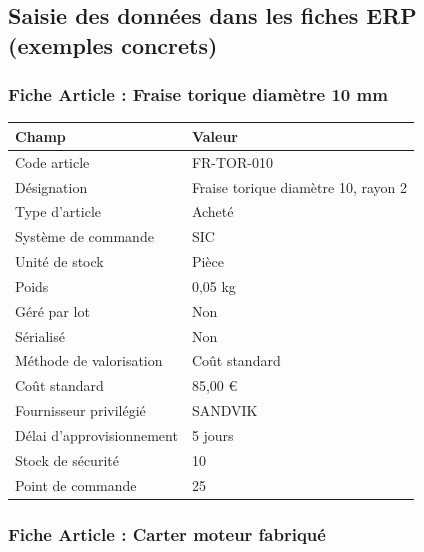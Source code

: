 \documentclass{article}
\begin{document}
\begin{table}[h]
\subsection{Saisie des données dans les fiches ERP (exemples concrets)}

\subsubsection{Fiche Article : Fraise torique diamètre 10 mm}

\begin{tcolorbox}[colback=grisclair, colframe=gray!70!black, title=Exemple : Fiche article ERP - Fraise torique]
\begin{tabular}{|l|l|}
\hline
\textbf{Champ} & \textbf{Valeur} \\
\hline
Code article & \textsc{FR-TOR-010} \\
Désignation & Fraise torique diamètre 10, rayon 2 \\
Type d'article & Acheté \\
Système de commande & SIC \\
Unité de stock & Pièce \\
Poids & 0,05 kg \\
Géré par lot & Non \\
Sérialisé & Non \\
Méthode de valorisation & Coût standard \\
Coût standard & 85,00 € \\
Fournisseur privilégié & SANDVIK \\
Délai d'approvisionnement & 5 jours \\
Stock de sécurité & 10 \\
Point de commande & 25 \\
\hline
\end{tabular}
\end{tcolorbox}

\subsubsection{Fiche Article : Carter moteur fabriqué}


\end{table}
\end{document}
